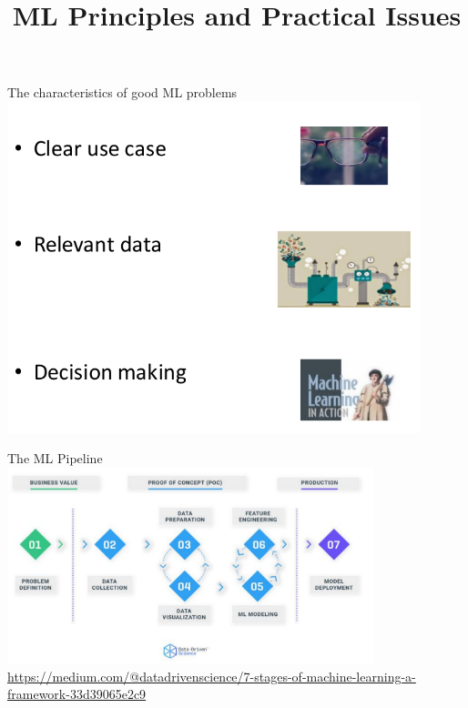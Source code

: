\documentclass[aspectratio=169,14pt,usenames,dvipsnames]{beamer}
\begin{document}
{\1
\begin{frame} \vspace{35pt}
	\title[ML Principles and  Practical Issues]{ML Principles and Practical Issues}
	\maketitle
\end{frame}
}

\begin{frame}[t]{The characteristics of good ML problems}
\centering
\includegraphics[width=0.9\textwidth, height=0.7\textheight]{Images/AIML_MLPrinciples_IMG1.png}
\end{frame}

\begin{frame}[t]{The ML Pipeline}
\centering
\includegraphics[width=0.8\textwidth, height=0.6\textheight]{Images/AIML_MLPrinciples_IMG2.png}\\
{\small{\url{https://medium.com/@datadrivenscience/7-stages-of-machine-learning-a-framework-33d39065e2c9}}}
\end{frame}
\end{document}
